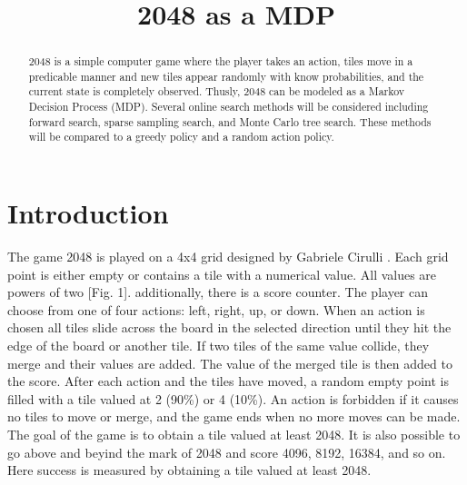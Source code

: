 \documentclass[conference]{IEEEtran}
\begin{document}
\title{2048 as a MDP}

\author{
}

\maketitle

\begin{abstract}
2048 is a simple computer game where the player takes an action, tiles move in a predicable manner and new tiles appear randomly with know probabilities, and the current state is completely observed. Thusly, 2048 can be modeled as a Markov Decision Process (MDP). Several online search methods will be considered including forward search, sparse sampling search, and Monte Carlo tree search. These methods will be compared to a greedy policy and a random action policy.
\end{abstract}
\section{Introduction}

The game 2048 is played on a 4x4 grid designed by Gabriele Cirulli \cite{2048}. Each grid point is either empty or contains a tile with a numerical value. All values are powers of two [Fig. 1]. additionally, there is a score counter. The player can choose from one of four actions: left, right, up, or down. When an action is chosen all tiles slide across the board in the selected direction until they hit the edge of the board or another tile. If two tiles of the same value collide, they merge and their values are added. The value of the merged tile is then added to the score. After each action and the tiles have moved, a random empty point is filled with a tile valued at 2 (90\%) or 4 (10\%). An action is forbidden if it causes no tiles to move or merge, and the game ends when no more moves can be made. The goal of the game is to obtain a tile valued at least 2048. It is also possible to go above and beyind the mark of 2048 and score 4096, 8192, 16384, and so on. Here success is measured by obtaining a tile valued at least 2048.
\end{document}
